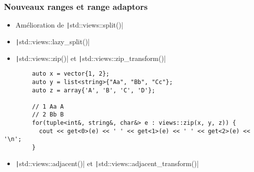 \documentclass[C++.tex]{subfiles}
\begin{document}
\begin{frame}[fragile]
	\frametitle{Nouveaux ranges et range adaptors}
	\begin{itemize}
		\item Amélioration de \texttt|std::views::split()|
		\item \texttt|std::views::lazy_split()|
		\item \texttt|std::views::zip()| et \texttt|std::views::zip_transform()|
	\end{itemize}

	\begin{verbatim}
		auto x = vector{1, 2};
		auto y = list<string>{"Aa", "Bb", "Cc"};
		auto z = array{'A', 'B', 'C', 'D'};

		// 1 Aa A
		// 2 Bb B
		for(tuple<int&, string&, char&> e : views::zip(x, y, z)) {
		  cout << get<0>(e) << ' ' << get<1>(e) << ' ' << get<2>(e) << '\n';
		}
   	\end{verbatim}

	\begin{itemize}
		\item \texttt|std::views::adjacent()| et \texttt|std::views::adjacent_transform()|
	\end{itemize}
\end{frame}
\end{document}
